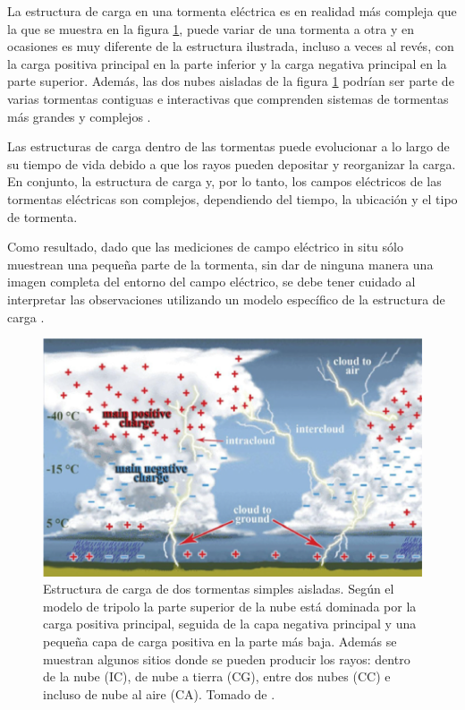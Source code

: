 \documentclass[12pt,oneside,openany,letter]{book}
\begin{document}
La estructura de carga en una tormenta eléctrica es en realidad más compleja que la que se muestra en la figura \ref{fig:tormenta_modelo}, puede variar de una tormenta a otra y en ocasiones es muy diferente de la estructura ilustrada, incluso a veces al revés, con la carga positiva principal en la parte inferior y la carga negativa principal en la parte superior. Además, las dos nubes aisladas de la figura \ref{fig:tormenta_modelo} podrían ser parte de varias tormentas contiguas e interactivas que comprenden sistemas de tormentas más grandes y complejos \cite{DwyerUman2014}. 

Las estructuras de carga dentro de las tormentas puede evolucionar a lo largo de su tiempo de vida debido a que los rayos pueden depositar y reorganizar la carga. En conjunto, la estructura de carga y, por lo tanto, los campos eléctricos de las tormentas eléctricas son complejos, dependiendo del tiempo, la ubicación y el tipo de tormenta. 

Como resultado, dado que las mediciones de campo eléctrico in situ sólo muestrean una pequeña parte de la tormenta, sin dar de ninguna manera una imagen completa del entorno del campo eléctrico, se debe tener cuidado al interpretar las observaciones utilizando un modelo específico de la estructura de carga \cite{DwyerUman2014}.

\begin{figure}
    \centering
    \includegraphics[scale=0.7]{figures/tormenta_modelo.png}
    \caption[Estructura de carga de dos tormentas simples aisladas según el modelo de tripolo.]{Estructura de carga de dos tormentas simples aisladas. Según el modelo de tripolo la parte superior de la nube está dominada por la carga positiva principal, seguida de la capa negativa principal y una pequeña capa de carga positiva en la parte más baja. Además se muestran algunos sitios donde se pueden producir los rayos: dentro de la nube (IC), de nube a tierra (CG), entre dos nubes (CC) e incluso de nube al aire (CA). Tomado de \cite{DwyerUman2014}.}
    \label{fig:tormenta_modelo}
\end{figure}
\end{document}
